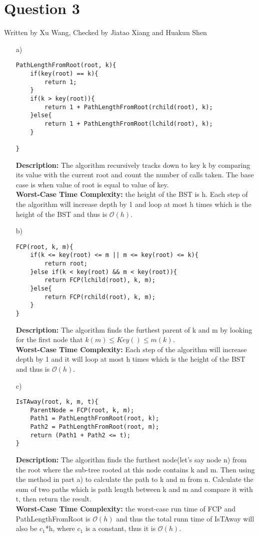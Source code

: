 \documentclass[10pt]{article}
\begin{document}
\section*{Question 3} Written by Xu Wang, Checked by Jiatao Xiang and Huakun Shen
\begin{itemize}
\item[a)]
\begin{lstlisting}[frame=single]
PathLengthFromRoot(root, k){
    if(key(root) == k){
        return 1;    
    }
    if(k > key(root)){
		return 1 + PathLengthFromRoot(rchild(root), k);
    }else{
		return 1 + PathLengthFromRoot(lchild(root), k);
    }

}
\end{lstlisting}
\textbf{Description:} The algorithm recursively tracks down to key k by comparing its value with the current root and count the number of calls taken. The base case is when value of root is equal to value of key.\\
\textbf{Worst-Case Time Complexity:} the height of the BST is h. Each step of the algorithm will increase depth by 1 and loop at most h times which is the height of the BST and thus is $\mathcal{O}(h)$.
\item[b)]
\begin{lstlisting}[frame=single]
FCP(root, k, m){
    if(k <= key(root) <= m || m <= key(root) <= k){
		return root;    
    }else if(k < key(root) && m < key(root)){
		return FCP(lchild(root), k, m);    
    }else{
		return FCP(rchild(root), k, m);    
    }
}
\end{lstlisting}
\textbf{Description:} The algorithm finds the furthest parent of k and m by looking for the first node that $k (m)\leq Key() \leq m (k)$.\\
\textbf{Worst-Case Time Complexity:} Each step of the algorithm will increase depth by 1 and it will loop at most h times which is the height of the BST and thus is $\mathcal{O}(h)$.

\item[c)]
\begin{lstlisting}[frame=single]
IsTAway(root, k, m, t){
    ParentNode = FCP(root, k, m);
    Path1 = PathLengthFromRoot(root, k);
    Path2 = PathLengthFromRoot(root, m);
    return (Path1 + Path2 <= t);
}
\end{lstlisting}
\textbf{Description:} The algorithm finds the furthest node(let's say node n) from the root where the sub-tree rooted at this node contains k and m. Then using the method in part a) to calculate the path to k and m from n. Calculate the sum of two paths which is path length between k and m and compare it with t, then return the result.\\
\textbf{Worst-Case Time Complexity:} the worst-case run time of FCP and PathLengthFromRoot is $\mathcal{O}(h)$ and thus the total runn time of IsTAway will also be $c_1$*h, where $c_1$ is a constant, thus it is $\mathcal{O}(h)$.
\end{itemize}
\end{document}
